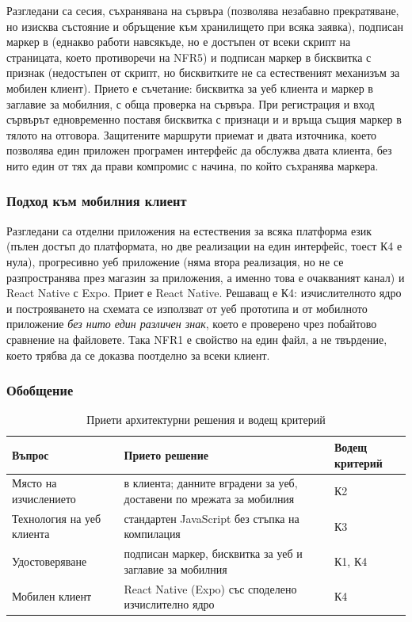 Разгледани са сесия, съхранявана на сървъра (позволява незабавно прекратяване, но
изисква състояние и обръщение към хранилището при всяка заявка), подписан маркер в
 (еднакво работи навсякъде, но е достъпен от всеки скрипт на
страницата, което противоречи на NFR5) и подписан маркер в бисквитка с признак
 (недостъпен от скрипт, но бисквитките не са естественият механизъм за
мобилен клиент). Прието е съчетание: бисквитка за уеб клиента и маркер в заглавие за
мобилния, с обща проверка на сървъра. При регистрация и вход сървърът едновременно
поставя бисквитка  с признаци  и  и
връща същия маркер в тялото на отговора. Защитените маршрути приемат и двата източника,
което позволява един приложен програмен интерфейс да обслужва двата клиента, без нито
един от тях да прави компромис с начина, по който съхранява маркера.

\subsubsection{Подход към мобилния клиент}
\label{subsec:mobilechoice}

Разгледани са отделни приложения на естествения за всяка платформа език (пълен достъп
до платформата, но две реализации на един интерфейс, тоест К4 е нула), прогресивно уеб
приложение (няма втора реализация, но не се разпространява през магазин за приложения,
а именно това е очакваният канал) и React Native с Expo. Приет е React Native.
Решаващ е К4: изчислителното ядро  и построяването на схемата
 се използват от уеб прототипа и от мобилното приложение
\emph{без нито един различен знак}, което е проверено чрез побайтово сравнение на
файловете. Така NFR1 е свойство на един файл, а не твърдение, което трябва да се
доказва поотделно за всеки клиент.

\subsubsection{Обобщение}
\label{subsec:choice-summary}

\begin{table}[htbp]
\centering
\caption{Приети архитектурни решения и водещ критерий}
\label{tab:choices}
{\fontsize{10}{12}\selectfont
\begin{tabular}{@{}L{3.5cm}L{6.4cm}L{2.6cm}@{}}
\toprule
\textbf{Въпрос} & \textbf{Прието решение} & \textbf{Водещ критерий} \\
\midrule
Място на изчислението & в клиента; данните вградени за уеб, доставени по мрежата за мобилния & К2 \\
Технология на уеб клиента & стандартен JavaScript без стъпка на компилация & К3 \\
Удостоверяване & подписан маркер, бисквитка  за уеб и заглавие  за мобилния & К1, К4 \\
Мобилен клиент & React Native (Expo) със споделено изчислително ядро & К4 \\
\bottomrule
\end{tabular}}
\end{table}

